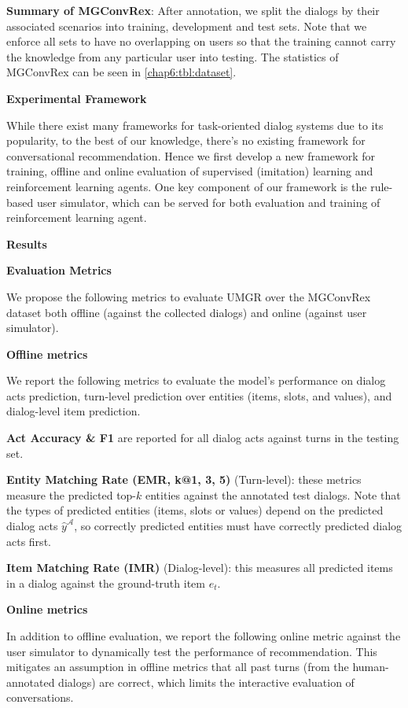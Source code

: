 \noindent \textbf{Summary of \textbf{MGConvRex}}:
\label{sec:dataset_stat}
After annotation, we split the dialogs by their associated scenarios into training, development and test sets.
Note that we enforce all sets to have no overlapping on users so that the training cannot carry the knowledge from any particular user into testing.
The statistics of MGConvRex can be seen in \ref{chap6:tbl:dataset}.

\textbf{Experimental Framework}

While there exist many frameworks for task-oriented dialog systems \cite{li2016user,li2018microsoft,lee2019convlab} due to its popularity,
to the best of our knowledge, there's no existing framework for conversational recommendation.
Hence we first develop a new framework for training, offline and online evaluation of supervised (imitation) learning and reinforcement learning agents.
One key component of our framework is the rule-based user simulator, which can be served for both evaluation and training of reinforcement learning agent.

\textbf{Results}
\label{chap6:sec:exp}

\textbf{Evaluation Metrics}

We propose the following metrics to evaluate UMGR over the MGConvRex dataset both offline (against the collected dialogs) and online (against user simulator).

\textbf{Offline metrics}

We report the following metrics to evaluate the model's performance on dialog acts prediction, turn-level prediction over entities (items, slots, and values), and dialog-level item prediction.

\noindent \textbf{Act Accuracy \& F1} are reported for all dialog acts against turns in the testing set.

\noindent \textbf{Entity Matching Rate (EMR, k@1, 3, 5)} (Turn-level): these metrics measure the predicted top-$k$ entities against the annotated test dialogs. 
Note that the types of predicted entities (items, slots or values) depend on the predicted dialog acts $\hat{y}^\mathcal{A}$, so correctly predicted entities must have correctly predicted dialog acts first.

\noindent \textbf{Item Matching Rate (IMR)} (Dialog-level): this measures all predicted items in a dialog against the ground-truth item $e_t$.

\textbf{Online metrics}

In addition to offline evaluation, we report the following online metric against the user simulator to dynamically test the performance of recommendation. This mitigates an assumption in offline metrics that all past turns (from the human-annotated dialogs) are correct, which limits the interactive evaluation of conversations.

